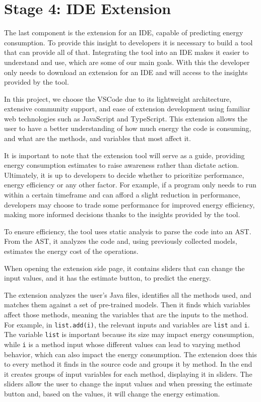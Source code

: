 \section{Stage 4: IDE Extension} \label{sec:work_stage4_extension_build}

The last component is the extension for an IDE, capable of predicting energy consumption. 
To provide this insight to developers it is necessary to build a tool that can provide all of that. Integrating the tool into an IDE makes it easier to understand and use, which are some of our main goals. With this the developer only needs to download an extension for an IDE and will access to the insights provided by the tool.

In this project, we choose the VSCode due to its lightweight architecture, extensive community support, and ease of extension development using familiar web technologies such as JavaScript and TypeScript. This extension allows the user to have a better understanding of how much energy the code is consuming, and what are the methods, and variables that most affect it.

It is important to note that the extension tool will serve as a guide, providing energy consumption estimates to raise awareness rather than dictate action. Ultimately, it is up to developers to decide whether to prioritize performance, energy efficiency or any other factor. For example, if a program only needs to run within a certain timeframe and can afford a slight reduction in performance, developers may choose to trade some performance for improved energy efficiency, making more informed decisions thanks to the insights provided by the tool.

To ensure efficiency, the tool uses static analysis to parse the code into an AST. From the AST, it analyzes the code and, using previously collected models, estimates the energy cost of the operations.


When opening the extension side page, it contains sliders that can change the input values, and it has the estimate button, to predict the energy.

The extension analyzes the user's Java files, identifies all the methods used, and matches them against a set of pre-trained models. Then it finds which variables affect those methods, meaning the variables that are the inputs to the method. For example, in \texttt{list.add(i)}, the relevant inputs and variables are \texttt{list} and \texttt{i}. The variable \texttt{list} is important because its size may impact energy consumption, while \texttt{i} is a method input whose different values can lead to varying method behavior, which can also impact the energy consumption.
The extension does this to every method it finds in the source code and groups it by method. In the end it creates groups of input variables for each method, displaying it in sliders. The sliders allow the user to change the input values and when pressing the estimate button and, based on the values, it will change the energy estimation.

